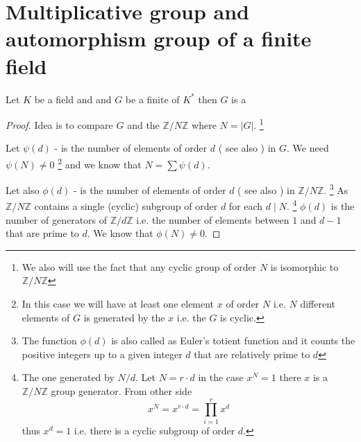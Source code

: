 \section{Multiplicative group and automorphism group of a finite
  field}
\begin{theorem}
  Let $K$ be a field and and $G$ be a finite  of
  $K^*$ then $G$ is a 
  \begin{proof}
    Idea is to compare $G$ and the 
    $\mathbb{Z}/N\mathbb{Z}$ where $N = \left|G\right|$.
    \footnote{
      We also will use the fact that any cyclic group of order $N$ is
      isomorphic to $\mathbb{Z}/N\mathbb{Z}$
    }

    Let $\psi\left(d\right)$ - is the number of elements of order $d$
    ( see also ) in $G$. We need
    $\psi\left(N\right) \ne 0$
    \footnote{
      In this case we will have at least one element $x$ of order $N$
      i.e. $N$ different elements of $G$ is generated by the $x$
      i.e. the $G$ is cyclic.
    }
    and we know that
    $N = \sum \psi\left(d\right)$.
    
    Let also $\phi\left(d\right)$ - is the number of elements of order $d$
    ( see also ) in $\mathbb{Z}/N\mathbb{Z}$.
    \footnote{      
      The function $\phi\left(d\right)$ is also called as Euler's
      totient function and it 
      counts the positive integers up to a given integer $d$ that are
      relatively prime to $d$ 
    }
    As $\mathbb{Z}/N\mathbb{Z}$ contains a single (cyclic) subgroup of
    order $d$ for each $d \mid N$.
    \footnote{
      The one generated by $N/d$. Let $N = r \cdot d$ in the case
      $x^N = 1$ there $x$ is a $\mathbb{Z}/N\mathbb{Z}$ group
      generator. From other side
      \[
      x^N = x^{r \cdot d} = \prod_{i=1}^r x^d
      \]
      thus $x^d = 1$ i.e. there is a cyclic subgroup of order $d$.
    }
    $\phi\left(d\right)$ is the number of generators of
    $\mathbb{Z}/d\mathbb{Z}$ i.e. the number of elements between $1$
    and $d-1$ that are prime to $d$. We know that
    $\phi\left(N\right) \ne 0$.


\end{proof}
\end{theorem}
